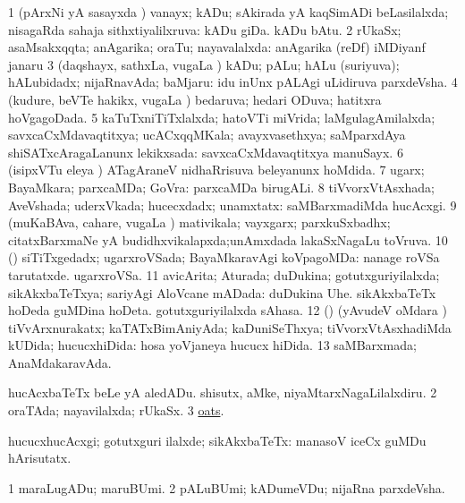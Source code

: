 \bentry
{} 
\gl{\gu}
\expl{}
\bmng
\bnum
\num{1} (pArxNi yA sasayxda \vi) vanayx; kADu; sAkirada yA kaqSimADi beLasilalxda; nisagaRda sahaja sithxtiyalilxruva:  kADu giDa.  kADu bAtu. 
\num{2} rUkaSx; asaMsakxqqta; anAgarika; oraTu; nayavalalxda:  anAgarika (reDf) iMDiyanf janaru 
\num{3} (daqshayx, sathxLa, \mo vugaLa \vi) kADu; pALu; hALu (suriyuva); hALubidadx; nijaRnavAda; baMjaru:  idu inUnx pALAgi uLidiruva parxdeVsha. 
\num{4} (kudure, beVTe hakikx, \mo vugaLa \vi) bedaruva; hedari ODuva; hatitxra hoVgagoDada. 
\num{5} kaTuTxniTiTxlalxda; hatoVTi miVrida; laMgulagAmilalxda; savxcaCxMdavaqtitxya; ucACxqqMKala; avayxvasethxya; saMparxdAya shiSATxcAragaLanunx lekikxsada:  savxcaCxMdavaqtitxya manuSayx. 
\num{6} (isipxVTu eleya \vi) ATagAraneV nidhaRrisuva beleyanunx hoMdida. 
\num{7} ugarx; BayaMkara; parxcaMDa; GoVra:  parxcaMDa birugALi. 
\num{8} tiVvorxVtAsxhada; AveVshada; uderxVkada; hucecxdadx; unamxtatx:  saMBarxmadiMda hucAcxgi. 
\num{9} (muKaBAva, cahare, \mo vugaLa \vi) mativikala; vayxgarx; parxkuSxbadhx; citatxBarxmaNe yA budidhxvikalapxda;unAmxdada lakaSxNagaLu toVruva. 
\num{10} (\AmA) siTiTxgedadx; ugarxroVSada; BayaMkaravAgi koVpagoMDa:  nanage roVSa tarutatxde.  ugarxroVSa. 
\num{11} avicArita; Aturada; duDukina; gotutxguriyilalxda; sikAkxbaTeTxya; sariyAgi AloVcane mADada:  duDukina Uhe.  sikAkxbaTeTx hoDeda guMDina hoDeta.  gotutxguriyilalxda sAhasa. 
\num{12} (\AmA) (yAvudeV oMdara \vi) tiVvArxnurakatx; kaTATxBimAniyAda; kaDuniSeThxya; tiVvorxVtAsxhadiMda kUDida; hucucxhiDida:  hosa yoVjaneya hucucx hiDida. 
\num{13} saMBarxmada; AnaMdakaravAda. 
\enum
\emng

\noindent 
\gl{\pagu}
\bmng
\bnum
{}  
\banum
{} hucAcxbaTeTx beLe yA aledADu. 
 shisutx, aMke, niyaMtarxNagaLilalxdiru. 
\eanum
\numie
\num{2}  oraTAda; nayavilalxda; rUkaSx. 
\num{3}  \hyperref{kandict_o.pdf}{O}{oat pagu(3)}{oats}. 
\enum
\emng
\eentry

\bentry
{}
\gl{\kirxvi}
\bmng
hucucxhucAcxgi; gotutxguri ilalxde; sikAkxbaTeTx:  manasoV iceCx guMDu hArisutatx. 
\emng
\eentry

\bentry
{}
\gl{\nA}
\expl{}
\bmng
\bnum
\num{1} maraLugADu; maruBUmi. 
\num{2} pALuBUmi; kADumeVDu; nijaRna parxdeVsha. 
\enum
\emng

